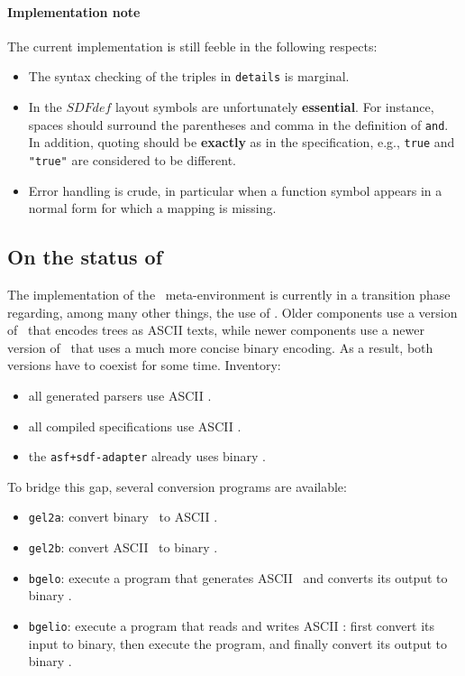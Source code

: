 \paragraph{Implementation note} The current implementation is still feeble
in the following respects:
\begin{itemize}
\item The syntax checking of the triples in {\tt details} is marginal.
\item In the $SDFdef$ layout symbols are unfortunately {\bf essential}.
For instance, spaces should surround the parentheses and comma in
the definition of {\tt and}. In addition, quoting should be
{\bf exactly} as in the specification, e.g., {\tt true} and
{\tt "true"} are considered to be different.
\item Error handling is crude, in particular when a function
symbol appears in a normal form for which a mapping is missing.
\end{itemize}

\subsection{On the status of \GEL} The implementation of the \ASFSDF\ meta-environment
is currently in a transition phase regarding, among many other things, the use of \GEL.
Older components use a version of \GEL\  that encodes trees as ASCII texts, while
newer components use a newer version of \GEL\  that uses a much more concise binary
encoding. As a result, both versions have to coexist for some time. Inventory:
\begin{itemize}
\item all generated parsers use ASCII \GEL.
\item all compiled specifications use ASCII \GEL.
\item the {\tt asf+sdf-adapter} already uses binary \GEL.
\end{itemize}
To bridge this gap, several conversion programs are available:
\begin{itemize}
\item {\tt gel2a}: convert binary \GEL\ to ASCII \GEL.
\item {\tt gel2b}: convert ASCII \GEL\ to binary \GEL.
\item {\tt bgelo}: execute a program that generates ASCII \GEL\ and converts its output
to binary \GEL.
\item {\tt bgelio}: execute a program that reads and writes ASCII \GEL: first convert 
its input to binary, then execute the program, and finally convert its output
to binary \GEL.
\end{itemize}

